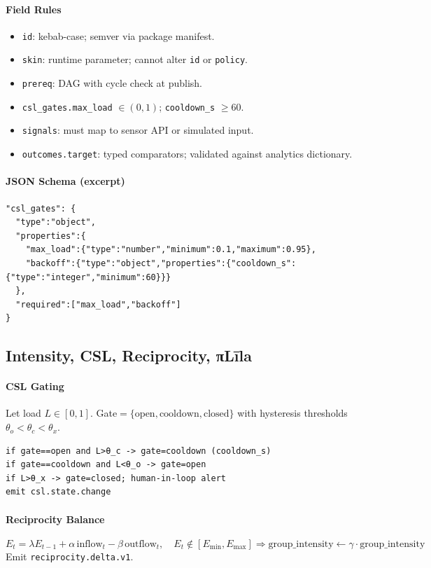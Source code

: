 \documentclass[11pt]{article}
\theoremstyle{plain}
\begin{document}
\paragraph{Field Rules}
\begin{itemize}
  \item \texttt{id}: kebab-case; semver via package manifest.
  \item \texttt{skin}: runtime parameter; cannot alter \texttt{id} or \texttt{policy}.
  \item \texttt{prereq}: DAG with cycle check at publish.
  \item \texttt{csl\_gates.max\_load} $\in (0,1)$; \texttt{cooldown\_s} $\ge 60$.
  \item \texttt{signals}: must map to sensor API or simulated input.
  \item \texttt{outcomes.target}: typed comparators; validated against analytics dictionary.
\end{itemize}

\paragraph{JSON Schema (excerpt)}
\begin{verbatim}
"csl_gates": {
  "type":"object",
  "properties":{
    "max_load":{"type":"number","minimum":0.1,"maximum":0.95},
    "backoff":{"type":"object","properties":{"cooldown_s":{"type":"integer","minimum":60}}}
  },
  "required":["max_load","backoff"]
}
\end{verbatim}

\subsection{Intensity, CSL, Reciprocity, πLīla}
\paragraph{CSL Gating}
Let load $L\in[0,1]$. Gate$=\{\mathrm{open},\mathrm{cooldown},\mathrm{closed}\}$ with hysteresis thresholds $\theta_{o}<\theta_{c}<\theta_{x}$.
\begin{verbatim}
if gate==open and L>θ_c -> gate=cooldown (cooldown_s)
if gate==cooldown and L<θ_o -> gate=open
if L>θ_x -> gate=closed; human-in-loop alert
emit csl.state.change
\end{verbatim}

\paragraph{Reciprocity Balance}
\[
E_t=\lambda E_{t-1}+\alpha\,\text{inflow}_t-\beta\,\text{outflow}_t,\quad
E_t\notin[E_{\min},E_{\max}] \Rightarrow \text{group\_intensity}\leftarrow\gamma\cdot\text{group\_intensity}
\]
Emit \texttt{reciprocity.delta.v1}.
\end{document}
